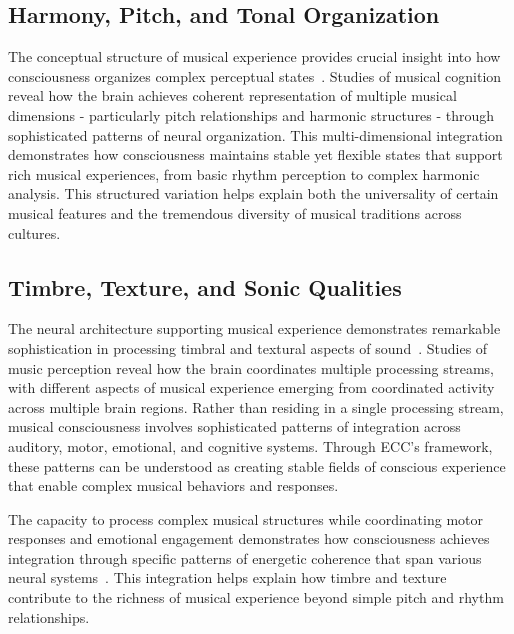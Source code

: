 \subsection*{Harmony, Pitch, and Tonal Organization}
The conceptual structure of musical experience provides crucial insight into how consciousness organizes complex perceptual states~\cite{Zbikowski2002, amil2024theta, Bharucha2006}. Studies of musical cognition reveal how the brain achieves coherent representation of multiple musical dimensions - particularly pitch relationships and harmonic structures - through sophisticated patterns of neural organization. This multi-dimensional integration demonstrates how consciousness maintains stable yet flexible states that support rich musical experiences, from basic rhythm perception to complex harmonic analysis. This structured variation helps explain both the universality of certain musical features and the tremendous diversity of musical traditions across cultures.

\subsection*{Timbre, Texture, and Sonic Qualities}
The neural architecture supporting musical experience demonstrates remarkable sophistication in processing timbral and textural aspects of sound~\cite{Zatorre2007, hunt2024electromagnetic, Peretz2005, van2025processes}. Studies of music perception reveal how the brain coordinates multiple processing streams, with different aspects of musical experience emerging from coordinated activity across multiple brain regions. Rather than residing in a single processing stream, musical consciousness involves sophisticated patterns of integration across auditory, motor, emotional, and cognitive systems. Through ECC's framework, these patterns can be understood as creating stable fields of conscious experience that enable complex musical behaviors and responses.

The capacity to process complex musical structures while coordinating motor responses and emotional engagement demonstrates how consciousness achieves integration through specific patterns of energetic coherence that span various neural systems~\cite{Fitch2015, pinotsis2023cytoelectric}. This integration helps explain how timbre and texture contribute to the richness of musical experience beyond simple pitch and rhythm relationships.

